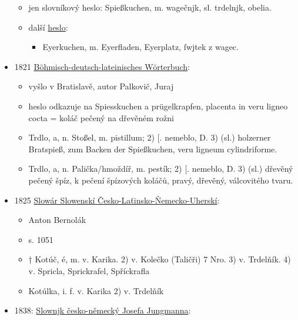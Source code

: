 \begin{itemize}
  \begin{itemize}
  \tightlist
  \item
    jen slovníkový heslo: Spießkuchen, m. wagečnjk, sl. trdelnjk,
    obelia.
  \item
    další
    \href{https://bara.ujc.cas.cz/slovniky/dobrovsky/dobrovsky195.html}{heslo}:

    \begin{itemize}
    \tightlist
    \item
      Eyerkuchen, m. Eyerfladen, Eyerplatz, ſwjtek z wagec.
    \end{itemize}
  \end{itemize}
\item
  1821
  \href{https://ndk.cz/view/uuid:46b33740-ac9f-11dc-bcf0-000d606f5dc6?page=uuid\%3A52eb1c50-0ecb-11e8-bdb0-005056827e51&fulltext=trdelnjk}{Böhmisch-deutsch-lateinisches
  Wörterbuch}:

  \begin{itemize}
  \tightlist
  \item
    vyšlo v Bratislavě, autor Palkovič, Juraj
  \item
    heslo odkazuje na Spiesskuchen a prügelkrapfen, placenta in veru
    ligneo cocta = koláč pečený na dřevěném rožni
  \item
    Trdlo, a, n. Stoßel, m. pistillum; 2) {[}. nemeblo, D. 3) (sl.)
    holzerner Bratspieß, zum Backen der Spießkuchen, veru ligneum
    cylindriforme.
  \item
    Trdlo, a, n. Palička/hmoždíř, m. pestík; 2) {[}. nemeblo, D. 3)
    (sl.) dřevěný pečený špíz, k pečení špízových koláčů, pravý,
    dřevěný, válcovitého tvaru.
  \end{itemize}
\item
  1825
  \href{https://www.google.cz/books/edition/Slow\%C3\%A1r_Slowensk\%C3\%AD_\%C4\%8Cesko_La\%C5\%A5insko_\%C5\%87em/Sd1bAAAAcAAJ?hl=cs&gbpv=1&dq=trdeln\%C3\%ADk&pg=PA1051&printsec=frontcover}{Slowár
  Slowenskí Česko-Laťinsko-Ňemecko-Uherskí}:

  \begin{itemize}
  \tightlist
  \item
    Anton Bernolák
  \item
    s. 1051
  \item
    † Kotúč, é, m. v. Karika. 2) v. Kolečko (Taličři) 7 Nro. 3) v.
    Trdelňík. 4) v. Spricla, Sprickrafel, Spříckrafla
  \item
    Kotúlka, i. f. v. Karika 2) v. Trdelňík
  \end{itemize}
\item
  1838:
  \href{https://ndk.cz/uuid/uuid:b6d79670-8232-11dc-abad-000d606f5dc6}{Slownjk
  česko-německý Josefa Jungmanna}:


\end{itemize}
